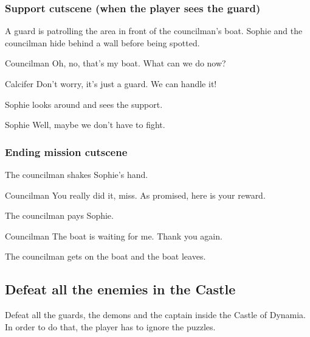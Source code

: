 \subsubsection*{Support cutscene (when the player sees the guard)}
\begin{screenplay}

A guard is patrolling the area in front of the councilman's boat. Sophie and the councilman hide behind a wall before being spotted.

\begin{dialogue}[worried]{Councilman}
Oh, no, that's my boat. What can we do now?
\end{dialogue}

\begin{dialogue}{Calcifer}
Don't worry, it's just a guard. We can handle it!
\end{dialogue}

Sophie looks around and sees the support.

\begin{dialogue}{Sophie}
Well, maybe we don't have to fight.
\end{dialogue}

\end{screenplay}

\subsubsection*{Ending mission cutscene}
\begin{screenplay}

The councilman shakes Sophie's hand.

\begin{dialogue}[grateful]{Councilman}
You really did it, miss. As promised, here is your reward.
\end{dialogue}

The councilman pays Sophie.

\begin{dialogue}[continuing]{Councilman}
The boat is waiting for me. Thank you again.
\end{dialogue}

The councilman gets on the boat and the boat leaves.

\end{screenplay}


\subsection{Defeat all the enemies in the Castle}
Defeat all the guards, the demons and the captain inside the Castle of Dynamia. In order to do that, the player has to ignore the puzzles.


